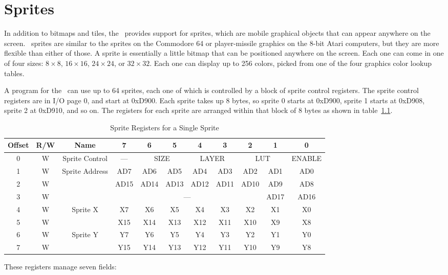\chapter{Sprites}

In addition to bitmaps and tiles, the \jr\ provides support for sprites, which are mobile graphical objects that can appear anywhere on the screen. \jr\ sprites are similar to the sprites on the Commodore 64 or player-missile graphics on the 8-bit Atari computers, but they are more flexible than either of those. A sprite is essentially a little bitmap that can be positioned anywhere on the screen. Each one can come in one of four sizes: $8 \times 8$, $16 \times 16$, $24 \times 24$, or $32 \times 32$. Each one can display up to 256 colors, picked from one of the four graphics color lookup tables.

A program for the \jr\ can use up to 64 sprites, each one of which is controlled by a block of sprite control registers. The sprite control registers are in I/O page 0, and start at 0xD900. Each sprite takes up 8 bytes, so sprite 0 starts at 0xD900, sprite 1 starts at 0xD908, sprite 2 at 0xD910, and so on. The registers for each sprite are arranged within that block of 8 bytes as shown in table~\ref{tab:sp_reg}.

\begin{table}[h]
    \begin{center}
        \begin{tabular}{|c|c|c|c|c|c|c|c|c|c|c|} \hline
            Offset & R/W & Name & 7 & 6 & 5 & 4 & 3 & 2 & 1 & 0 \\ \hline\hline
            0 & W & Sprite Control & --- & \multicolumn{2}{|c|}{SIZE} & \multicolumn{2}{|c|}{LAYER} & \multicolumn{2}{|c|}{LUT} & ENABLE \\ \hline
            1 & W & \multirow{3}{*}{Sprite Address} & AD7 & AD6 & AD5 & AD4 & AD3 & AD2 & AD1 & AD0 \\ \cline{1-2}\cline{4-11}
            2 & W &  & AD15 & AD14 & AD13 & AD12 & AD11 & AD10 & AD9 & AD8 \\ \cline{1-2}\cline{4-11}
            3 & W &  & \multicolumn{6}{|c|}{---} & AD17 & AD16 \\ \hline
            4 & W & \multirow{2}{*}{Sprite X} & X7 & X6 & X5 & X4 & X3 & X2 & X1 & X0 \\ \cline{1-2}\cline{4-11}
            5 & W &  & X15 & X14 & X13 & X12 & X11 & X10 & X9 & X8 \\ \hline
            6 & W & \multirow{2}{*}{Sprite Y} & Y7 & Y6 & Y5 & Y4 & Y3 & Y2 & Y1 & Y0 \\ \cline{1-2}\cline{4-11}
            7 & W &  & Y15 & Y14 & Y13 & Y12 & Y11 & Y10 & Y9 & Y8 \\ \hline
        \end{tabular}
    \end{center}
    \caption{Sprite Registers for a Single Sprite}
    \label{tab:sp_reg}
\end{table}
These registers manage seven fields:

